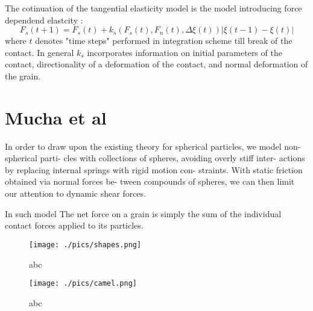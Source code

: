 \documentclass[10pt,a4paper]{article}
\begin{document}
\cite{perez}

The cotinuation of the tangential elasticity model is the model introducing force dependend elastcity \cite{wb86}:
\[
 F_s(t+1) = F_s(t) + k_s(F_s(t), F_n(t), \Delta \xi(t)) |\xi(t-1) - \xi(t)|
\]
where $t$ denotes "time steps" performed in integration scheme till break of the contact. 
In general $k_s$ incorporates information on initial parameters of the contact, directionality of a deformation of the contact,
and normal deformation of the grain.

\section{Mucha et al \cite{mucha05}}
In order to draw upon the existing
theory for spherical particles, we model non-spherical parti-
cles with collections of spheres, avoiding overly stiff inter-
actions by replacing internal springs with rigid motion con-
straints. With static friction obtained via normal forces be-
tween compounds of spheres, we can then limit our attention
to dynamic shear forces.

In such model The net force
on a grain is simply the sum of the individual contact forces
applied to its particles.

\begin{figure}[tb]
\centering
\texttt{[image: ./pics/shapes.png]}
\caption{abc}
\label{fig:shapes}
\end{figure}

\begin{figure}[tb]
\centering
\texttt{[image: ./pics/camel.png]}
\caption{abc}
\label{fig:camel}
\end{figure}




\thispagestyle{empty} %




\clearpage
\end{document}
